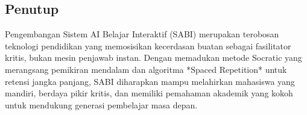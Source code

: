 \documentclass[12pt,a4paper]{article}
\begin{document}
\subsection{Penutup}
Pengembangan Sistem AI Belajar Interaktif (SABI) merupakan terobosan teknologi pendidikan yang memosisikan kecerdasan buatan sebagai fasilitator kritis, bukan mesin penjawab instan. Dengan memadukan metode Socratic yang merangsang pemikiran mendalam dan algoritma *Spaced Repetition* untuk retensi jangka panjang, SABI diharapkan mampu melahirkan mahasiswa yang mandiri, berdaya pikir kritis, dan memiliki pemahaman akademik yang kokoh untuk mendukung generasi pembelajar masa depan.
\end{document}
